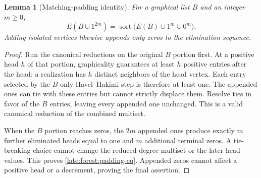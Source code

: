 \documentclass[11pt,a4paper]{article}
\newtheorem{lemma}[theorem]{Lemma}
\theoremstyle{definition}\newtheorem{definition}[theorem]{Definition}
\theoremstyle{remark}\newtheorem{remark}[theorem]{Remark}
\begin{document}
\begin{lemma}[Matching-padding identity]\label{late:forest:padding-identity}
For a graphical list $B$ and an integer $m\ge0$,
\begin{equation}\label{late:forest:padding-eq}
 E(B\cup1^{2m})
 =\operatorname{sort}\bigl(E(B)\cup1^m\cup0^m\bigr).
\end{equation}
Adding isolated vertices likewise appends only zeros to the elimination
sequence.
\end{lemma}
\begin{proof}
Run the canonical reductions on the original $B$ portion first. At a
positive head $h$ of that portion, graphicality guarantees at least $h$
positive entries after the head: a realization has $h$ distinct neighbors
of the head vertex. Each entry selected by the $B$-only Havel--Hakimi
step is therefore at least one. The appended ones can tie with these
entries but cannot strictly displace them. Resolve ties in favor of the
$B$ entries, leaving every appended one unchanged. This is a valid
canonical reduction of the combined multiset.

When the $B$ portion reaches zeros, the $2m$ appended ones produce
exactly $m$ further eliminated heads equal to one and $m$ additional
terminal zeros. A tie-breaking choice cannot change the reduced degree
multiset or the later head values. This proves
\eqref{late:forest:padding-eq}. Appended zeros cannot affect a positive
head or a decrement, proving the final assertion.
\end{proof}
\end{document}
